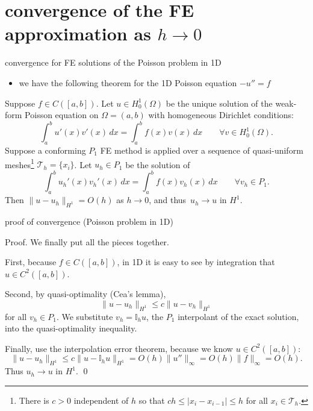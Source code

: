 \documentclass[10pt,
               svgnames,
               hyperref={colorlinks,
                         citecolor=DeepPink4,
                         linkcolor=FireBrick,
                         urlcolor=blue},
               usepdftitle=false]{beamer}
\newcommand{\II}{\mathbb{I}}
\begin{document}
\section{convergence of the FE approximation as $h\to 0$}

\begin{frame}{convergence for FE solutions of the Poisson problem in 1D}

\begin{itemize}
\item we have the following theorem for the 1D Poisson equation $-u'' = f$
\end{itemize}

\begin{theorem}
Suppose $f\in C([a,b])$.  Let $u\in H_0^1(\Omega)$ be the unique solution of the weak-form Poisson equation on $\Omega=(a,b)$ with homogeneous Dirichlet conditions:
	$$\int_a^b u'(x) v'(x)\,dx = \int_a^b f(x) v(x)\,dx \qquad \forall v \in H_0^1(\Omega).$$
Suppose a conforming $P_1$ FE method is applied over a sequence of quasi-uniform meshes\footnote{There is $c>0$ independent of $h$ so that $c h \le |x_i-x_{i-1}| \le h$ for all $x_i \in \mathcal{T}_h$.} $\mathcal{T}_h = \{x_i\}$.  Let $u_h \in P_1$ be the solution of
	$$\int_a^b u_h'(x) v_h'(x)\,dx = \int_a^b f(x) v_h(x)\,dx \qquad \forall v_h \in P_1.$$
Then $\|u-u_h\|_{H^1} = O(h)$ as $h\to 0$, and thus\, \alert{$u_h \to u$ in $H^1$}.
\end{theorem}
\end{frame}


\begin{frame}{proof of convergence (Poisson problem in 1D)}

Proof.  We finally put all the pieces together.

\medskip
First, because $f\in C([a,b])$, in 1D it is easy to see by integration that \alert{$u\in C^2([a,b])$}.

\medskip
Second, by quasi-optimality (Cea's lemma),
	$$\|u-u_h\|_{H^1} \le c \|u-v_h\|_{H^1}$$
for all $v_h\in P_1$.  We \alert{substitute $v_h=\II_h u$}, the $P_1$ interpolant of the exact solution, into the quasi-optimality inequality.

\medskip
Finally, \alert{use the interpolation error theorem}, because we know $u\in C^2([a,b])$:
	$$\|u-u_h\|_{H^1} \le c \|u-\II_h u\|_{H^1} = O(h) \|u''\|_\infty = O(h) \|f\|_\infty = O(h).$$
Thus $u_h\to u$ in $H^1$. \hfill \qed
\end{frame}
\end{document}
